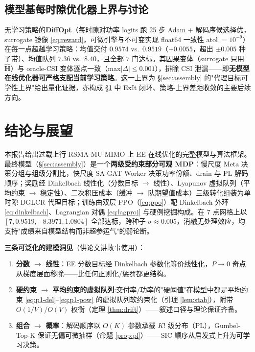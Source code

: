 \documentclass[UTF8,11pt,a4paper]{ctexart}
\theoremstyle{plain}
\theoremstyle{definition}
\theoremstyle{remark}
\newcommand{\vect}[1]{\mathbf{#1}}
\begin{document}
\subsection{模型基每时隙优化器上界与讨论} \label{sec:results-diffopt}

无学习策略的\textbf{DiffOpt}（每时隙对功率 logits 跑 25 步 Adam + 解码序候选择优，surrogate 镜像 \eqref{eq:reward}，可微引擎与不可变实现 float64 一致性 atol $=10^{-9}$）在每一点超越学习策略：均值交付 $0.9574$ vs.\ $0.9519$（$+0.0055$，超出 $\pm0.005$ 种子带）、均值队列 $7.36$ vs.\ $8.40$，且全部 $7$ 门达标。其因果变体（surrogate 只用 $\hat{\vect{H}}$）与 oracle-CSI 变体逐点一致（max$|\Delta|\le0.001$），排除 CSI 泄漏——即\textbf{无模型在线优化器可严格支配当前学习策略}。这一上界为 \S\ref{sec:assembly} 的"代理目标可学性上界"给出量化证据，亦构成 \S\ref{sec:conclusion} 中 ExIt 闭环、策略-上界差距收敛的主要后续方向。

\section{结论与展望} \label{sec:conclusion}

本报告给出过载上行 RSMA-MU-MIMO 上 EE 在线优化的完整模型与算法框架。最终模型（\S\ref{sec:assembly}）是一个\textbf{两级受约束部分可观 MDP}：慢尺度 Meta 决策分组与组级分割比，快尺度 SA-GAT Worker 决策功率份额、drain 与 PL 解码顺序；奖励经 Dinkelbach 线性化（分数目标 $\to$ 线性）、Lyapunov 虚拟队列（平均约束 $\to$ 稳定性）、二次积压成本（缓冲 $\to$ 队期望值成本）三级转化组装为单时隙 DGLCR 代理目标；训练由双层 PPO（\eqref{eq:ppo}）配 Dinkelbach 外环 \eqref{eq:dinkelbach}、Lagrangian 对偶 \eqref{eq:lagproj} 与硬例挖掘构成。在 $7$ 点网格上以 $[7,0.9519,-8.3971,1.0804]$ 全部达标，跨种子 $\sigma\approx0.005$，消融无处理效应，均支持"成绩来自模型结构而非超参运气"的弱论断。

\textbf{三条可泛化的建模洞见}（供论文讲故事使用）：
\begin{enumerate}
\item \textbf{分数 $\to$ 线性}：EE 分数目标经 Dinkelbach 参数化等价线性化，$P\to0$ 奇点从梯度层面移除——比任何正则化/惩罚都更结构。
\item \textbf{硬约束 $\to$ 平均约束的虚拟队列}:交付率/功率的"硬阈值"在模型中都是平均约束 \eqref{eq:p1-del}--\eqref{eq:p1-pow} 的虚拟队列软约束化（引理 \ref{lem:stab}），附带 $O(1/V)$/$O(V)$ 权衡（定理 \ref{thm:drift}）——叙述口径与理论保证齐备。
\item \textbf{组合 $\to$ 概率}：解码顺序以 $O(K)$ 参数承载 $K!$ 级分布（PL），Gumbel-Top-K 保证无偏可微抽样（命题 \ref{prop:pl}）——SIC 顺序从启发式上升为可学习决策。
\end{enumerate}
\end{document}
